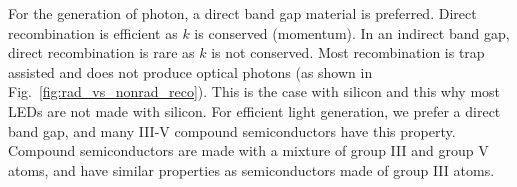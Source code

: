 For the generation of photon, a direct band gap material is preferred.  Direct recombination is efficient as $k$ is conserved (momentum).  In an indirect band gap, direct recombination is rare as $k$ is not conserved.  Most recombination is trap assisted and does not produce optical photons (as shown in Fig.~\ref{fig:rad_vs_nonrad_reco}).  This is the case with silicon and this why most LEDs are not made with silicon. For efficient light generation, we prefer a direct band gap, and many III-V compound semiconductors have this property.  Compound semiconductors are made with a mixture of group III and group V atoms, and have similar properties as semiconductors made of group III atoms.

